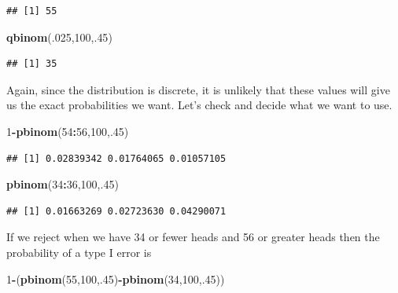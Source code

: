 \documentclass[]{book}
\newenvironment{Shaded}{\begin{snugshade}}{\end{snugshade}}
\newcommand{\KeywordTok}[1]{\textcolor[rgb]{0.13,0.29,0.53}{\textbf{#1}}}
\newcommand{\DecValTok}[1]{\textcolor[rgb]{0.00,0.00,0.81}{#1}}
\newcommand{\OperatorTok}[1]{\textcolor[rgb]{0.81,0.36,0.00}{\textbf{#1}}}
\newcommand{\NormalTok}[1]{#1}
\theoremstyle{definition}
\theoremstyle{definition}
\theoremstyle{definition}
\theoremstyle{remark}
\begin{document}
\begin{verbatim}
## [1] 55
\end{verbatim}

\begin{Shaded}
\begin{Highlighting}[]
\KeywordTok{qbinom}\NormalTok{(.}\DecValTok{025}\NormalTok{,}\DecValTok{100}\NormalTok{,.}\DecValTok{45}\NormalTok{)}
\end{Highlighting}
\end{Shaded}

\begin{verbatim}
## [1] 35
\end{verbatim}

Again, since the distribution is discrete, it is unlikely that these
values will give us the exact probabilities we want. Let's check and
decide what we want to use.

\begin{Shaded}
\begin{Highlighting}[]
\DecValTok{1}\OperatorTok{-}\KeywordTok{pbinom}\NormalTok{(}\DecValTok{54}\OperatorTok{:}\DecValTok{56}\NormalTok{,}\DecValTok{100}\NormalTok{,.}\DecValTok{45}\NormalTok{)}
\end{Highlighting}
\end{Shaded}

\begin{verbatim}
## [1] 0.02839342 0.01764065 0.01057105
\end{verbatim}

\begin{Shaded}
\begin{Highlighting}[]
\KeywordTok{pbinom}\NormalTok{(}\DecValTok{34}\OperatorTok{:}\DecValTok{36}\NormalTok{,}\DecValTok{100}\NormalTok{,.}\DecValTok{45}\NormalTok{)}
\end{Highlighting}
\end{Shaded}

\begin{verbatim}
## [1] 0.01663269 0.02723630 0.04290071
\end{verbatim}

If we reject when we have 34 or fewer heads and 56 or greater heads then
the probability of a type I error is

\begin{Shaded}
\begin{Highlighting}[]
\DecValTok{1}\OperatorTok{-}\NormalTok{(}\KeywordTok{pbinom}\NormalTok{(}\DecValTok{55}\NormalTok{,}\DecValTok{100}\NormalTok{,.}\DecValTok{45}\NormalTok{)}\OperatorTok{-}\KeywordTok{pbinom}\NormalTok{(}\DecValTok{34}\NormalTok{,}\DecValTok{100}\NormalTok{,.}\DecValTok{45}\NormalTok{))}
\end{Highlighting}
\end{Shaded}
\end{document}
